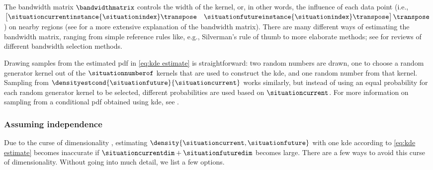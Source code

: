 The bandwidth matrix $\bandwidthmatrix$ controls the width of the kernel, or, in other words, the influence of each data point \cstartb (i.e., $\begin{bmatrix}\situationcurrentinstance{\situationindex}\transpose & \situationfutureinstance{\situationindex}\transpose\end{bmatrix}\transpose$) \cendb on nearby regions \cstartb (see \autocite{wand1994multivariate} for a more extensive explanation of the bandwidth matrix)\cendb. 
There are many different ways of estimating the bandwidth matrix, ranging from simple reference rules like, e.g., Silverman's rule of thumb \autocite{silverman1986density} to more elaborate methods; see \autocite{turlach1993bandwidthselection, chiu1996comparative, jones1996brief, bashtannyk2001bandwidth, zambom2013review} for reviews of different bandwidth selection methods.

Drawing samples from the estimated \ac{pdf} in \cref{eq:kde estimate} is straightforward: two random numbers are drawn, one to choose a random generator kernel out of the $\situationnumberof$ kernels that are used to construct the \ac{kde}, and one random number from that kernel.
Sampling from $\densityestcond{\situationfuture}{\situationcurrent}$ works similarly, but instead of using an equal probability for each random generator kernel to be selected, different probabilities are used based on $\situationcurrent$.
For more information on sampling from a conditional \ac{pdf} obtained using \ac{kde}, see \autocite{holmes2012fast, degelder2021conditional}.



\cstartb\subsubsection{Assuming independence}\cendb
\label{sec:no special case}

Due to the curse of dimensionality \autocite{scott2015multivariate}, estimating $\density{\situationcurrent, \situationfuture}$ with one \ac{kde} according to \cref{eq:kde estimate} becomes inaccurate if $\situationcurrentdim + \situationfuturedim$ becomes large.
There are a few ways to avoid this curse of dimensionality.
Without going into much detail, we list a few options.

